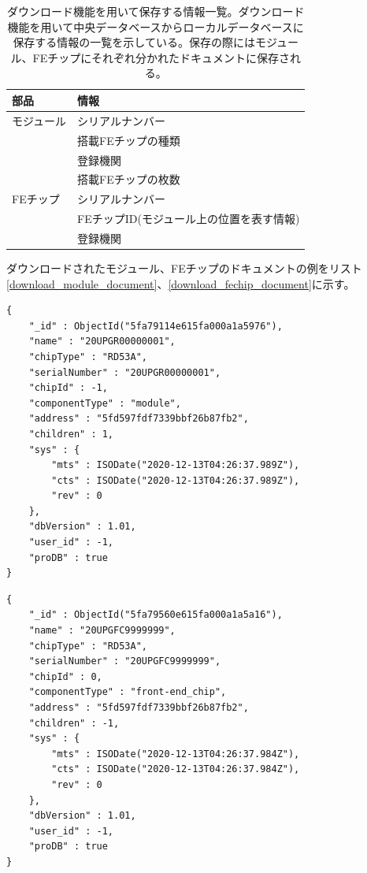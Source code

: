\begin{table}[tbp]
\begin{center}
\caption[ダウンロード機能を用いて保存する情報一覧。]{ダウンロード機能を用いて保存する情報一覧。ダウンロード機能を用いて中央データベースからローカルデータベースに保存する情報の一覧を示している。保存の際にはモジュール、FEチップにそれぞれ分かれたドキュメントに保存される。}
\label{download_information}
  \small
  \begin{tabular}{|ll|} \hline
    部品 & 情報 \\ \hline
    モジュール & シリアルナンバー \\ 
     & 搭載FEチップの種類  \\ 
     & 登録機関  \\ 
     & 搭載FEチップの枚数  \\ \hline 
    FEチップ & シリアルナンバー \\
     & FEチップID(モジュール上の位置を表す情報) \\  
     & 登録機関 \\ \hline 
  \end{tabular}
\end{center}
\end{table}

ダウンロードされたモジュール、FEチップのドキュメントの例をリスト\ref{download_module_document}、\ref{download_fechip_document}に示す。
\begin{lstlisting}[basicstyle=\scriptsize,caption=ダウンロードしたモジュール情報のドキュメントの例。ドキュメントが表\ref{download_information}の情報を持つことが分かる。,label=download_module_document]
{
	"_id" : ObjectId("5fa79114e615fa000a1a5976"),
	"name" : "20UPGR00000001",
	"chipType" : "RD53A",
	"serialNumber" : "20UPGR00000001",
	"chipId" : -1,
	"componentType" : "module",
	"address" : "5fd597fdf7339bbf26b87fb2",
	"children" : 1,
	"sys" : {
		"mts" : ISODate("2020-12-13T04:26:37.989Z"),
		"cts" : ISODate("2020-12-13T04:26:37.989Z"),
		"rev" : 0
	},
	"dbVersion" : 1.01,
	"user_id" : -1,
	"proDB" : true
}
\end{lstlisting}
\begin{lstlisting}[basicstyle=\scriptsize,caption=ダウンロードしたFEチップ情報のドキュメントの例。ドキュメントが表\ref{download_information}の情報を持つことが分かる。,label=download_fechip_document]
{
	"_id" : ObjectId("5fa79560e615fa000a1a5a16"),
	"name" : "20UPGFC9999999",
	"chipType" : "RD53A",
	"serialNumber" : "20UPGFC9999999",
	"chipId" : 0,
	"componentType" : "front-end_chip",
	"address" : "5fd597fdf7339bbf26b87fb2",
	"children" : -1,
	"sys" : {
		"mts" : ISODate("2020-12-13T04:26:37.984Z"),
		"cts" : ISODate("2020-12-13T04:26:37.984Z"),
		"rev" : 0
	},
	"dbVersion" : 1.01,
	"user_id" : -1,
	"proDB" : true
}
\end{lstlisting}


